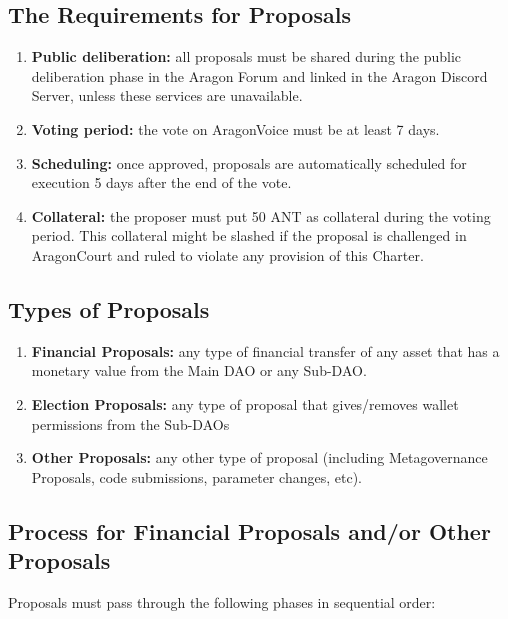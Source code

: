 \subsection{The Requirements for Proposals}

\begin{enumerate}
	\item \textbf{Public deliberation:} all proposals must be shared during the public deliberation phase in the Aragon Forum and linked in the Aragon Discord Server, unless these services are unavailable.
	\item \textbf{Voting period:} the vote on \gls{AragonVoice} must be at least 7 days.
	\item \textbf{Scheduling:} once approved, proposals are automatically scheduled for execution 5 days after the end of the vote.
	\item \textbf{Collateral:} the proposer must put 50 \ac{ANT} as collateral during the voting period.
	This collateral might be slashed if the proposal is challenged in \gls{AragonCourt} and ruled to violate any provision of this Charter.
\end{enumerate}


\subsection{Types of Proposals}

\begin{enumerate}		
	\item \textbf{Financial Proposals:} any type of financial transfer of any asset that has a monetary value from the Main \ac{DAO} or any Sub-\ac{DAO}.
	\item \textbf{Election Proposals:} any type of proposal that gives/removes wallet permissions from the Sub-\acp{DAO}
	\item \textbf{Other Proposals:} any other type of proposal (including Metagovernance Proposals, code submissions, parameter changes, etc).
\end{enumerate}

\subsection{Process for Financial Proposals and/or Other Proposals} 
Proposals must pass through the following phases in sequential order:


